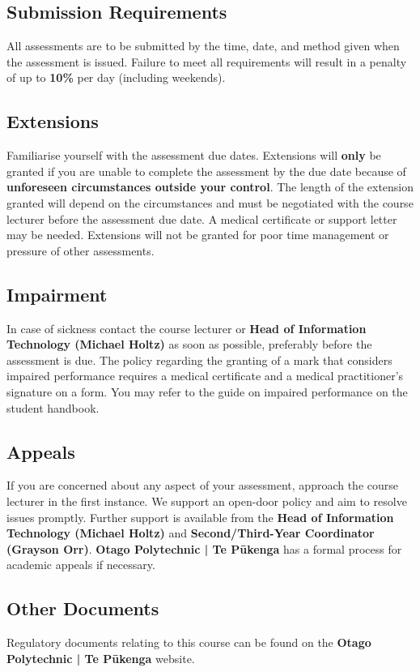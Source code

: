 \documentclass{article}
\begin{document}
\subsection*{Submission Requirements}
All assessments are to be submitted by the time, date, and method given when the assessment is issued. Failure to meet all requirements will result in a penalty of up to \textbf{10\%} per day (including weekends).

\subsection*{Extensions}
Familiarise yourself with the assessment due dates. Extensions will \textbf{only} be granted if you are unable to complete the assessment by the due date because of \textbf{unforeseen circumstances outside your control}. The length of the extension granted will depend on the circumstances and must be negotiated with the course lecturer before the assessment due date. A medical certificate or support letter may be needed. Extensions will not be granted for poor time management or pressure of other assessments.

\subsection*{Impairment}
In case of sickness contact the course lecturer or \textbf{Head of Information Technology (Michael Holtz)} as soon as possible, preferably before the assessment is due. The policy regarding the granting of a mark that considers impaired performance requires a medical certificate and a medical practitioner’s signature on a form. You may refer to the guide on impaired performance on the student handbook.

\subsection*{Appeals}
If you are concerned about any aspect of your assessment, approach the course lecturer in the first instance. We support an open-door policy and aim to resolve issues promptly. Further support is available from the \textbf{Head of Information Technology (Michael Holtz)} and \textbf{Second/Third-Year Coordinator (Grayson Orr)}. \textbf{Otago Polytechnic | Te Pūkenga} has a formal process for academic appeals if necessary.

\subsection*{Other Documents}
Regulatory documents relating to this course can be found on the \textbf{Otago Polytechnic | Te Pūkenga} website.
\end{document}
